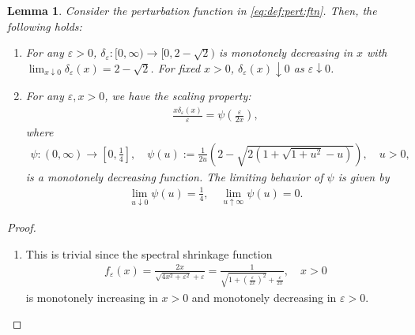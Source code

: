 \documentclass[noinfoline]{imsart}\setcounter{tocdepth}{2}
\theoremstyle{plain}
\newtheorem{lemma}[theorem]{Lemma}
\begin{document}
\begin{appendix}
\begin{lemma}\label{lem:pert:ftn:mono}
Consider the perturbation function in \eqref{eq:def:pert:ftn}. Then, the following holds:
\begin{enumerate}[leftmargin = *]
\item For any $\varepsilon > 0$, $\delta_{\varepsilon} : [0, \infty) \to [0, 2-\sqrt{2})$ is monotonely decreasing in $x$ with $\lim_{x \downarrow 0} \delta_{\varepsilon}(x) = 2 -\sqrt{2}$. For fixed $x > 0$, $\delta_{\varepsilon}(x) \downarrow 0$ as $\varepsilon \downarrow 0$.
\item For any $\varepsilon, x > 0$, we have the scaling property:
\begin{align*}
    \frac{x \delta_{\varepsilon}(x)}{\varepsilon} = \psi \left( \frac{\varepsilon}{2x} \right), 
\end{align*}
where
\begin{align*}
    \psi:(0, \infty) \to \left[0, \frac{1}{4} \right], \quad \psi(u) := 
        \frac{1}{2u} \left( 2 - \sqrt{2\left(1 + \sqrt{1+u^2}-u \right)} \right) , \quad u > 0,
\end{align*}
is a monotonely decreasing function. The limiting behavior of $\psi$ is given by
\begin{align*}
    \lim_{u \downarrow 0} \psi(u) = \frac{1}{4}, \quad \lim_{u \uparrow \infty} \psi(u) = 0.
\end{align*}
\end{enumerate}
\end{lemma}
\begin{proof}
\begin{enumerate}[leftmargin = *]
\item This is trivial since the spectral shrinkage function
\begin{align*}
    f_{\varepsilon}(x) = \frac{2x}{\sqrt{4x^{2}+\varepsilon^{2}}+\varepsilon}= \frac{1}{\sqrt{1 + \left(\frac{\varepsilon}{2x}\right)^2} + \frac{\varepsilon}{2x}}, \quad x>0
\end{align*}
is monotonely increasing in $x > 0$ and monotonely decreasing in $\varepsilon > 0$.


\end{enumerate}
\end{proof}
\end{appendix}
\end{document}
